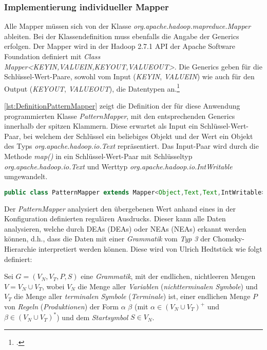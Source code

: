 \subsubsection{Implementierung individueller Mapper}\label{subsubsec:IndividuelleMapper}
Alle Mapper müssen sich von der Klasse \textit{org.apache.hadoop.mapreduce.Mapper} ableiten. Bei der Klassendefinition muss ebenfalls die Angabe der \glspl{Generic} erfolgen. Der Mapper wird in der Hadoop 2.7.1 \ac{API} der Apache Software Foundation definiert mit \textit{Class Mapper<KEYIN,VALUEIN,KEYOUT,VALUEOUT>}. Die \glspl{Generic} geben für die Schlüssel-Wert-Paare, sowohl vom Input (\textit{KEYIN}, \textit{VALUEIN}) wie auch für den Output (\textit{KEYOUT}, \textit{VALUEOUT}), die Datentypen an.\footcite[Vgl.][]{ApacheHadoopApiDokuMapper.2015}

\autoref{lst:DefinitionPatternMapper} zeigt die Definition der für diese Anwendung programmierten Klasse \textit{PatternMapper}, mit den entsprechenden Generics innerhalb der spitzen Klammern. Diese erwartet als Input ein Schlüssel-Wert-Paar, bei welchem der Schlüssel ein beliebiges Objekt und der Wert ein Objekt des Typs \textit{org.apache.hadoop.io.Text} repräsentiert. Das Input-Paar wird durch die Methode \textit{map()} in ein Schlüssel-Wert-Paar mit Schlüsseltyp \textit{org.apache.hadoop.io.Text} und Werttyp \textit{org.apache.hadoop.io.IntWritable} umgewandelt. \\

\begin{lstlisting}[language=Java,caption=Deklaration \textit{PatternMapper} mit Generics,label=lst:DefinitionPatternMapper]
public class PatternMapper extends Mapper<Object,Text,Text,IntWritable>
\end{lstlisting}

Der \textit{PatternMapper} analysiert den übergebenen Wert anhand eines in der Konfiguration definierten regulären Ausdrucks. Dieser kann alle Daten analysieren, welche durch \aclp{DEA} ({\color{LinkColor}\acsp{DEA}}) oder \aclp{NEA} ({\color{LinkColor}\acsp{NEA}}) erkannt werden können, d.h., dass die Daten mit einer \textit{Grammatik} vom \textit{Typ 3} der Chomsky-Hierarchie interpretiert werden können. Diese wird von Ulrich Hedtstück wie folgt definiert:

Sei $G = (V_N, V_T, P, S)$ eine \textit{Grammatik}, mit der endlichen, nichtleeren Mengen $V = V_N \cup V_T$, wobei $V_N$ die Menge aller \textit{Variablen} (\textit{nichtterminalen Symbole}) und $V_T$ die Menge aller \textit{terminalen Symbole} (\textit{Terminale}) ist, einer endlichen Menge $P$ von \textit{Regeln} (\textit{Produktionen}) der Form $\alpha$ \textrightarrow $\beta$ (mit $\alpha \in (V_N \cup V_T)^+$ und $\beta \in (V_N \cup V_T)^*$) und dem \textit{Startsymbol} $S \in V_N$. 

